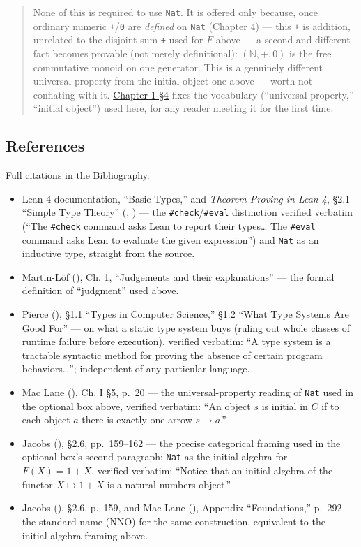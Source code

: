 \begin{quote}
None of this is required to use \texttt{Nat}. It is offered only because, once ordinary numeric \texttt{+}/\texttt{0} are \emph{defined} on \texttt{Nat} (Chapter 4) --- this \texttt{+} is addition, unrelated to the disjoint-sum \texttt{+} used for \(F\) above --- a second and different fact becomes provable (not merely definitional): \((\mathbb{N}, +, 0)\) is the free commutative monoid on one generator. This is a genuinely different universal property from the initial-object one above --- worth not conflating with it. \hyperref[sec:01-basics:04-terminology:1]{Chapter 1 §4} fixes the vocabulary (``universal property,'' ``initial object'') used here, for any reader meeting it for the first time.
\end{quote}

\subsection{References}\label{sec:01-basics:01-everything-has-a-type:4}

Full citations in the \hyperref[sec:root:bibliography:1]{Bibliography}.

\begin{itemize}
\tightlist
\item
  Lean 4 documentation, ``Basic Types,'' and \emph{Theorem Proving in Lean 4}, §2.1 ``Simple Type Theory'' (\cite{LeanDocs}, \cite{TPIL4}) --- the \texttt{\#check}/\texttt{\#eval} distinction verified verbatim (``The \texttt{\#check} command asks Lean to report their types\ldots{} The \texttt{\#eval} command asks Lean to evaluate the given expression'') and \texttt{Nat} as an inductive type, straight from the source.
\item
  Martin-Löf (\cite{MartinLof1984}), Ch. 1, ``Judgements and their explanations'' --- the formal definition of ``judgment'' used above.
\item
  Pierce (\cite{Pierce2002}), §1.1 ``Types in Computer Science,'' §1.2 ``What Type Systems Are Good For'' --- on what a static type system buys (ruling out whole classes of runtime failure before execution), verified verbatim: ``A type system is a tractable syntactic method for proving the absence of certain program behaviors\ldots{}''; independent of any particular language.
\item
  Mac Lane (\cite{MacLane1998}), Ch. I §5, p.~20 --- the universal-property reading of \texttt{Nat} used in the optional box above, verified verbatim: ``An object \(s\) is initial in \(C\) if to each object \(a\) there is exactly one arrow \(s \to a\).''
\item
  Jacobs (\cite{Jacobs1999}), §2.6, pp.~159--162 --- the precise categorical framing used in the optional box's second paragraph: \texttt{Nat} as the initial algebra for \(F(X) = 1 + X\), verified verbatim: ``Notice that an initial algebra of the functor \(X \mapsto 1 + X\) is a natural numbers object.''
\item
  Jacobs (\cite{Jacobs1999}), §2.6, p.~159, and Mac Lane (\cite{MacLane1998}), Appendix ``Foundations,'' p.~292 --- the standard name (NNO) for the same construction, equivalent to the initial-algebra framing above.
\end{itemize}
